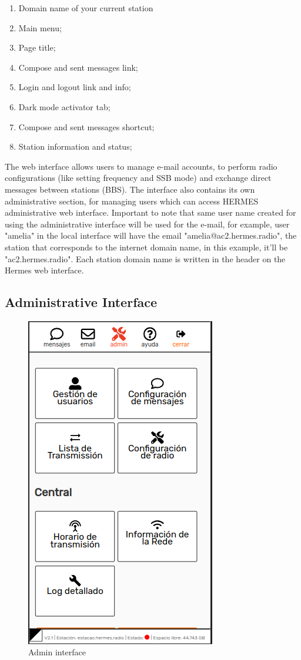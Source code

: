 \documentclass[11pt,a4paper]{article}
\begin{document}
\begin{enumerate}
    \item Domain name of your current station
    \item Main menu;
    \item Page title;
    \item Compose and sent messages link;
     \item Login and logout link and info;
     \item Dark mode activator tab;
    \item Compose and sent messages shortcut;
    \item Station information and status;
\end{enumerate}
    
    The web interface allows users to manage e-mail accounts, to perform radio configurations (like setting frequency and SSB mode) and exchange direct messages between stations (BBS). The interface also contains its own administrative section, for managing users which can access HERMES administrative web interface. Important to note that same user name created for using the administrative interface will be used for the e-mail, for example, user "amelia" in the local interface will have the email "amelia@ac2.hermes.radio", the station that corresponds to the internet domain name, in this example, it'll be "ac2.hermes.radio". Each station domain name is written in the header on the Hermes web interface.

\subsection{Administrative Interface}
\label{admininterface}

\begin{figure}[H]
    \centering
    \includegraphics[width=0.5\columnwidth]{screenshots/frontend/es/admin.png}
    \caption{Admin interface}
    \label{fig:admin}
\end{figure}
\end{document}
